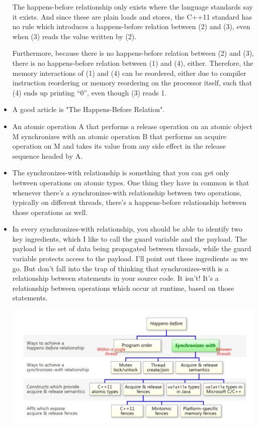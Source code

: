 \documentclass[a4paper,11pt,twoside]{book}
\begin{document}
\begin{itemize}
The happens-before relationship only exists where the language standards say it exists. And since these are plain loads and stores, the C++11 standard has no rule which introduces a happens-before relation between (2) and (3), even when (3) reads the value written by (2).

Furthermore, because there is no happens-before relation between (2) and (3), there is no happens-before relation between (1) and (4), either. Therefore, the memory interactions of (1) and (4) can be reordered, either due to compiler instruction reordering or memory reordering on the processor itself, such that (4) ends up printing “0”, even though (3) reads 1.

		\item A good article is "The Happens-Before Relation".

		\item An atomic operation A that performs a release operation on an atomic object M synchronizes with an atomic operation B that performs an acquire operation on M and takes its value from any side effect in the release sequence headed by A.

		\item The synchronizes-with relationship is something that you can get only between operations on atomic types. One thing they have in common is that whenever there’s a synchronizes-with relationship between two operations, typically on different threads, there’s a happens-before relationship between those operations as well.

		\item In every synchronizes-with relationship, you should be able to identify two key ingredients, which I like to call the guard variable and the payload. The payload is the set of data being propagated between threads, while the guard variable protects access to the payload. I’ll point out these ingredients as we go. But don’t fall into the trap of thinking that synchronizes-with is a relationship between statements in your source code. It isn’t! It’s a relationship between operations which occur at runtime, based on those statements.


\begin{center}
	\includegraphics[width=0.85\linewidth]{pics/happen_before.png}
\end{center}


\end{itemize}
\end{document}
